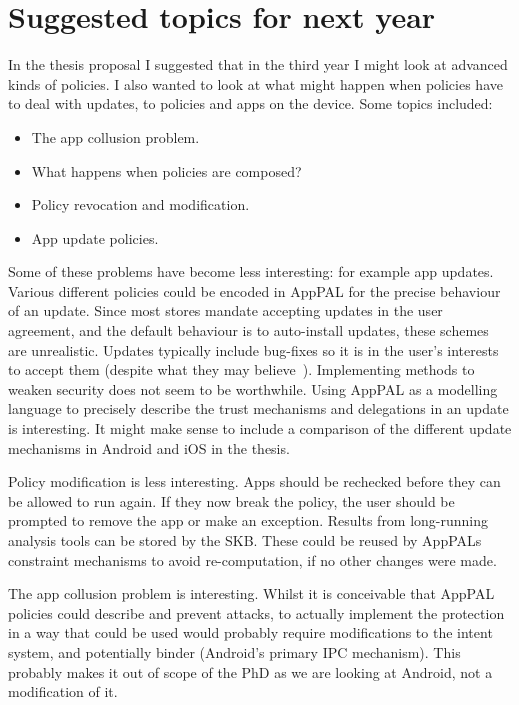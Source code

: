 \documentclass[a4paper]{scrartcl}
\begin{document}
\section{Suggested topics for next year}
\label{sec:futurework}

In the thesis proposal I suggested that in the third year I might look at advanced kinds of policies.
I also wanted to look at what might happen when policies have to deal with updates, to policies and apps on the device.
Some topics included:
\begin{itemize}
  \item The app collusion problem.
  \item What happens when policies are composed?
  \item Policy revocation and modification.
  \item App update policies.
\end{itemize}

Some of these problems have become less interesting: for example app updates.
Various different policies could be encoded in AppPAL for the precise behaviour of an update.
Since most stores mandate accepting updates in the user agreement, and the default behaviour is to auto-install updates, these schemes are unrealistic.
Updates typically include bug-fixes so it is in the user's interests to accept them (despite what they may believe~\citep{Vaniea:2014fk}).
Implementing methods to weaken security does not seem to be worthwhile.
Using AppPAL as a modelling language to precisely describe the trust mechanisms and delegations in an update is interesting.
It might make sense to include a comparison of the different update mechanisms in Android and iOS in the thesis.

Policy modification is less interesting.
Apps should be rechecked before they can be allowed to run again.
If they now break the policy, the user should be prompted to remove the app or make an exception.
Results from long-running analysis tools can be stored by the \ac{SKB}.
These could be reused by AppPALs constraint mechanisms to avoid re-computation, if no other changes were made.

The app collusion problem is interesting.
Whilst it is conceivable that AppPAL policies could describe and prevent attacks, to actually implement the protection in a way that could be used would probably require modifications to the intent system, and potentially binder (Android's primary IPC mechanism).
This probably makes it out of scope of the PhD as we are looking at Android, not a modification of it.
\end{document}
